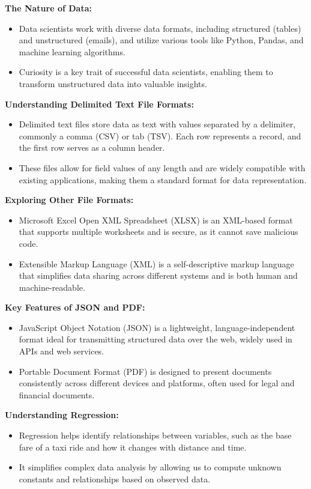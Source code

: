 \documentclass[12pt]{report} %
\begin{document}
		\noindent \textbf{The Nature of Data:}
		\begin{itemize}
			\item Data scientists work with diverse data formats, including structured (tables) and unstructured (emails), and utilize various tools like Python, Pandas, and machine learning algorithms.
			\item Curiosity is a key trait of successful data scientists, enabling them to transform unstructured data into valuable insights.
		\end{itemize}


	\noindent \textbf{Understanding Delimited Text File Formats:}
	\begin{itemize}
		\item Delimited text files store data as text with values separated by a delimiter, commonly a comma (CSV) or tab (TSV). Each row represents a record, and the first row serves as a column header.
		\item These files allow for field values of any length and are widely compatible with existing applications, making them a standard format for data representation.
	\end{itemize}
	
	\noindent \textbf{Exploring Other File Formats:}
	\begin{itemize}
		\item Microsoft Excel Open XML Spreadsheet (XLSX) is an XML-based format that supports multiple worksheets and is secure, as it cannot save malicious code.
		\item Extensible Markup Language (XML) is a self-descriptive markup language that simplifies data sharing across different systems and is both human and machine-readable.
	\end{itemize}
	
	\noindent \textbf{Key Features of JSON and PDF:}
	\begin{itemize}
		\item JavaScript Object Notation (JSON) is a lightweight, language-independent format ideal for transmitting structured data over the web, widely used in APIs and web services.
		\item Portable Document Format (PDF) is designed to present documents consistently across different devices and platforms, often used for legal and financial documents.
	\end{itemize}


	\noindent \textbf{Understanding Regression:}
	\begin{itemize}
		\item Regression helps identify relationships between variables, such as the base fare of a taxi ride and how it changes with distance and time.
		\item It simplifies complex data analysis by allowing us to compute unknown constants and relationships based on observed data.
	\end{itemize}
\end{document}
